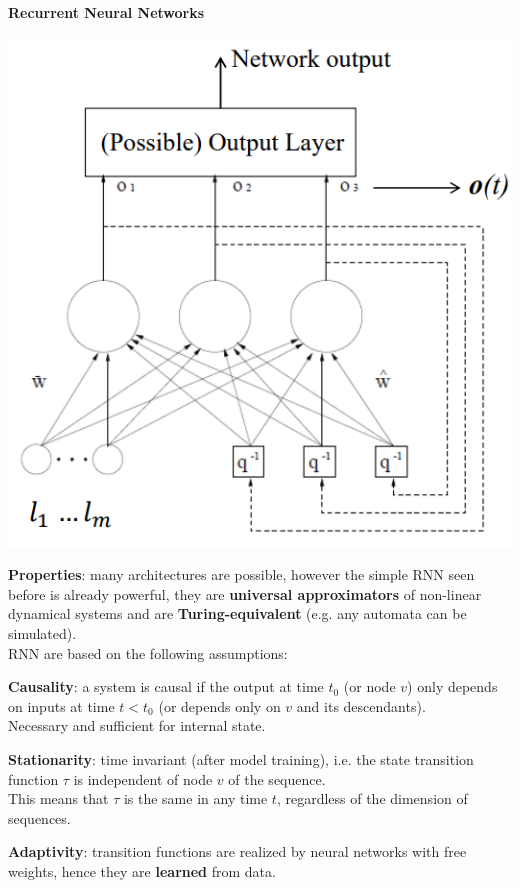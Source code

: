 \documentclass[10pt]{report}
\begin{document}
\paragraph{Recurrent Neural Networks} \begin{center}
	\includegraphics[scale=0.5]{37.png}
\end{center}
\textbf{Properties}: many architectures are possible, however the simple RNN seen before is already powerful, they are \textbf{universal approximators} of non-linear dynamical systems and are \textbf{Turing-equivalent} (e.g. any automata can be simulated).\\
RNN are based on the following assumptions:
\begin{list}{}{}
	\item \textbf{Causality}: a system is causal if the output at time $t_0$ (or node $v$) only depends on inputs at time $t<t_0$ (or depends only on $v$ and its descendants).\\
	Necessary and sufficient for internal state.
	\item \textbf{Stationarity}: time invariant (after model training), i.e. the state transition function $\tau$ is independent of node $v$ of the sequence.\\
	This means that $\tau$ is the same in any time $t$, regardless of the dimension of sequences.
	\item \textbf{Adaptivity}: transition functions are realized by neural networks with free weights, hence they are \textbf{learned} from data.
\end{list}
\end{document}
